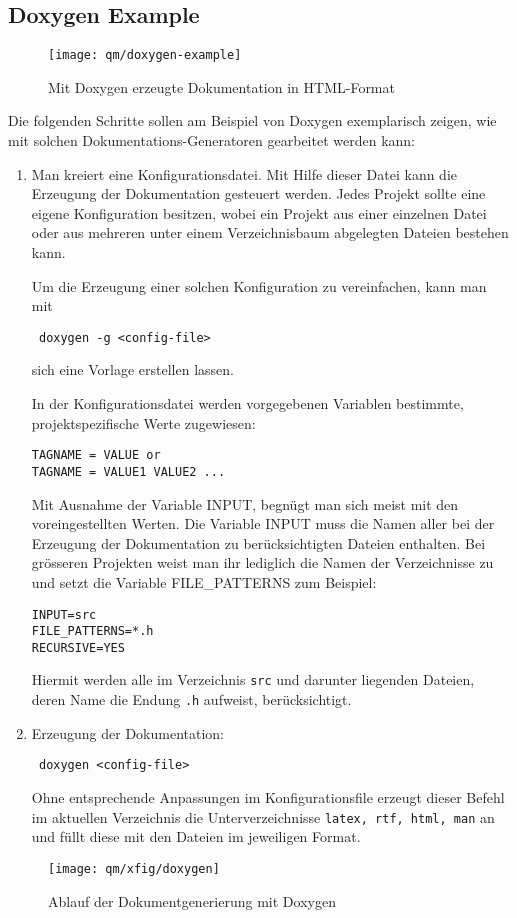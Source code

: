 \subsection{Doxygen Example}
\begin{figure}[H]
\begin{center}
\texttt{[image: qm/doxygen-example]}
\end{center}
\caption{Mit Doxygen erzeugte Dokumentation in HTML-Format}
\end{figure}
Die folgenden Schritte sollen am Beispiel von Doxygen exemplarisch
zeigen, wie mit solchen Dokumentations-Generatoren gearbeitet
werden kann:
\begin{enumerate}
\item Man kreiert eine Konfigurationsdatei. Mit Hilfe dieser
  Datei kann die Erzeugung der
  Dokumentation gesteuert werden. Jedes Projekt sollte eine
  eigene Konfiguration besitzen, wobei ein Projekt aus einer
  einzelnen Datei oder aus mehreren unter einem Verzeichnisbaum
  abgelegten Dateien bestehen kann.

  Um die Erzeugung einer solchen Konfiguration zu vereinfachen,
  kann man mit
\begin{verbatim}
 doxygen -g <config-file>
\end{verbatim}
sich eine Vorlage erstellen lassen.

In der Konfigurationsdatei werden vorgegebenen Variablen bestimmte,
projektspezifische Werte zugewiesen:
\begin{verbatim}
TAGNAME = VALUE or
TAGNAME = VALUE1 VALUE2 ...
\end{verbatim}
Mit Ausnahme der Variable INPUT, begnügt man sich meist
mit den voreingestellten Werten. Die Variable INPUT
muss die Namen aller bei der Erzeugung der Dokumentation
zu berücksichtigten Dateien enthalten. Bei grösseren
Projekten weist man ihr lediglich die Namen der Verzeichnisse
zu und setzt die Variable FILE\_PATTERNS
zum Beispiel:
\begin{verbatim}
INPUT=src
FILE_PATTERNS=*.h
RECURSIVE=YES
\end{verbatim}
Hiermit werden alle im Verzeichnis \verb+src+ und darunter
liegenden Dateien, deren Name die Endung \verb+.h+
aufweist, berücksichtigt.
\item Erzeugung der Dokumentation:
\begin{verbatim}
 doxygen <config-file>
\end{verbatim}
Ohne entsprechende Anpassungen im Konfigurationsfile erzeugt
dieser Befehl im aktuellen Verzeichnis die Unterverzeichnisse
\verb|latex, rtf, html, man| an und füllt diese mit
den Dateien im jeweiligen Format.
\end{enumerate}
\begin{figure}[H]
\begin{center}
\texttt{[image: qm/xfig/doxygen]}
\caption{Ablauf der Dokumentgenerierung mit Doxygen}
\end{center}
\end{figure}
